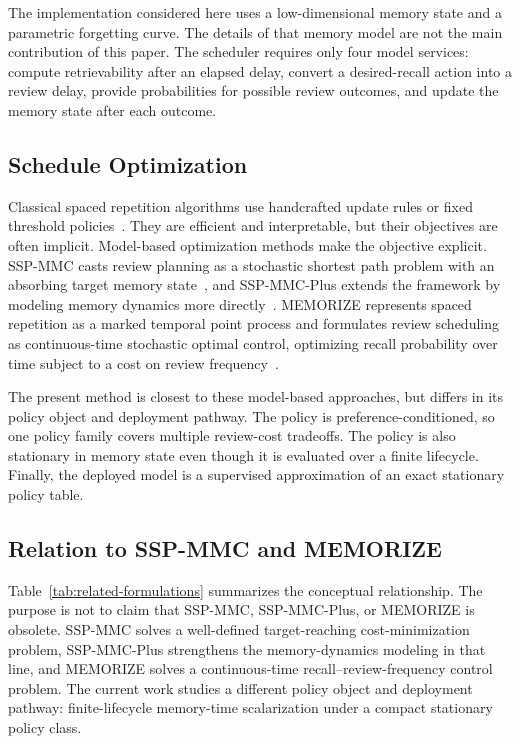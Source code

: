 \documentclass[11pt]{article}
\begin{document}
The implementation considered here uses a low-dimensional memory state and a parametric forgetting curve. The details of that memory model are not the main contribution of this paper. The scheduler requires only four model services: compute retrievability after an elapsed delay, convert a desired-recall action into a review delay, provide probabilities for possible review outcomes, and update the memory state after each outcome.

\subsection{Schedule Optimization}

Classical spaced repetition algorithms use handcrafted update rules or fixed threshold policies~\citep{pimsleur1967memory,leitner1972so,wozniak1990optimization}. They are efficient and interpretable, but their objectives are often implicit. Model-based optimization methods make the objective explicit. SSP-MMC casts review planning as a stochastic shortest path problem with an absorbing target memory state~\citep{ye2022stochastic}, and SSP-MMC-Plus extends the framework by modeling memory dynamics more directly~\citep{su2023optimizing}. MEMORIZE represents spaced repetition as a marked temporal point process and formulates review scheduling as continuous-time stochastic optimal control, optimizing recall probability over time subject to a cost on review frequency~\citep{tabibian2019enhancing}.

The present method is closest to these model-based approaches, but differs in its policy object and deployment pathway. The policy is preference-conditioned, so one policy family covers multiple review-cost tradeoffs. The policy is also stationary in memory state even though it is evaluated over a finite lifecycle. Finally, the deployed model is a supervised approximation of an exact stationary policy table.

\subsection{Relation to SSP-MMC and MEMORIZE}

Table~\ref{tab:related-formulations} summarizes the conceptual relationship. The purpose is not to claim that SSP-MMC, SSP-MMC-Plus, or MEMORIZE is obsolete. SSP-MMC solves a well-defined target-reaching cost-minimization problem, SSP-MMC-Plus strengthens the memory-dynamics modeling in that line, and MEMORIZE solves a continuous-time recall--review-frequency control problem. The current work studies a different policy object and deployment pathway: finite-lifecycle memory-time scalarization under a compact stationary policy class.
\end{document}
